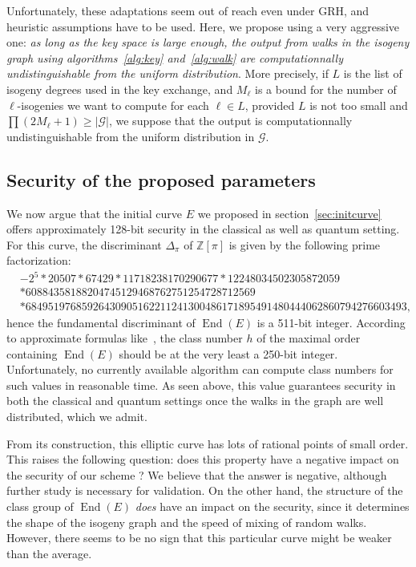 \documentclass{article}
\newcommand{\Z}{\mathbb{Z}}
\newcommand{\Graph}{\mathcal{G}}
\theoremstyle{definition}
\DeclareMathOperator{\End}{End}
\begin{document}
Unfortunately, these adaptations seem out of reach even under
GRH, and heuristic assumptions have to be used. Here, we propose using
a very aggressive one: \emph{as long as the key space is large
enough, the output from walks in the isogeny graph using algorithms~\ref{alg:key}
and~\ref{alg:walk} are computationnally undistinguishable from the uniform
distribution}. More precisely, if $L$ is the list of isogeny degrees used
in the key exchange, and $M_\ell$ is a bound for the number of $\ell$-isogenies
we want to compute for each $\ell\in L$, provided $L$ is not too small
and $\prod (2 M_\ell + 1) \geq |\Graph|$, we suppose that
the output is computationnally
undistinguishable from the uniform distribution in $\Graph$.

\subsection{Security of the proposed parameters}

We now argue that the initial curve $E$ we proposed in section~\ref{sec:initcurve}
offers approximately 128-bit security in the classical as well as quantum
setting. For this curve, the discriminant $\Delta_\pi$ of $\Z[\pi]$ is
given by the following prime factorization:
\[
\begin{aligned}
& -2^5 * 20507 * 67429 * 11718238170290677 * 12248034502305872059 \\
& * 60884358188204745129468762751254728712569\\
& * 68495197685926430905162211241300486171895491480444062860794276603493,
\end{aligned}
\]
hence the fundamental discriminant of $\End(E)$ is a 511-bit integer.
According to approximate formulas like~\cite{todo:classnumbers},
the class number $h$ of the maximal order containing $\End(E)$ should
be at the very least a 250-bit integer. Unfortunately,
no currently available algorithm can compute class numbers for such values
in reasonable time. As seen above, this value guarantees security
in both the classical and quantum settings once the walks in
the graph are well distributed, which we admit.

From its construction, this elliptic curve has lots of rational
points of small order. This raises the following question: does
this property have a negative impact on the security of our scheme ?
We believe that the answer is negative, although further study
is necessary for validation.
On the other hand, the structure of the class group of $\End(E)$
\emph{does} have an impact on the security, since it determines the
shape of the isogeny graph and the speed of mixing of random walks.
However, there seems to be no sign that this particular curve
might be weaker than the average.
\end{document}
